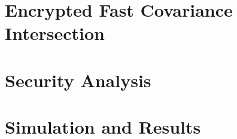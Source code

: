 \documentclass[letterpaper, 10 pt, conference]{ieeeconf}
\begin{document}
% 
%                                                                        
%                                                                        
%                                                                        
% 
\section{Encrypted Fast Covariance Intersection}


% 
%                                 
%                                 
%                                 
% 
\section{Security Analysis}


% 
%                                 
%                                 
%                                 
% 
\section{Simulation and Results}


% 
%                                               
%                                               
%                                               
% 
\end{document}
